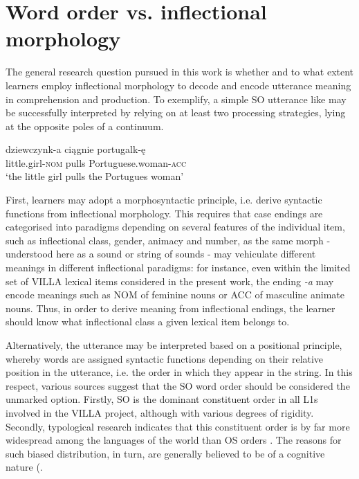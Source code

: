 \section{Word order vs. inflectional morphology}\label{sec:01:1}

The general research question pursued in this work is whether and to what extent learners employ inflectional morphology to decode and encode utterance meaning in comprehension and production. To exemplify, a simple SO utterance like  may be successfully interpreted by relying on at least two processing strategies, lying at the opposite poles of a continuum. 

\ea%
    \label{ex:01:3}
    \gll    dziewczynk-a ciągnie portugalk-ę\\
            little.girl-\textsc{nom} pulls Portuguese.woman-\textsc{acc}\\
    \glt    ‘the little girl pulls the Portugues woman’
    \z

First, learners may adopt a morphosyntactic principle, i.e. derive syntactic functions from inflectional morphology. This requires that case endings are categorised into paradigms depending on several features of the individual item, such as inflectional class, gender, animacy and number, as the same morph - understood here as a sound or string of sounds - may vehiculate different meanings in different inflectional paradigms: for instance, even within the limited set of VILLA lexical items considered in the present work, the ending \textit{{}-a} may encode meanings such as NOM of feminine nouns or ACC of masculine animate nouns. Thus, in order to derive meaning from inflectional endings, the learner should know what inflectional class a given lexical item belongs to.

Alternatively, the utterance may be interpreted based on a positional principle, whereby words are assigned syntactic functions depending on their relative position in the utterance, i.e. the order in which they appear in the string. In this respect, various sources suggest that the SO word order should be considered the unmarked option. Firstly, SO is the dominant constituent order in all L1s involved in the VILLA project, although with various degrees of rigidity. Secondly, typological research indicates that this constituent order is by far more widespread among the languages of the world than OS orders \citep{Dryer2013b}. The reasons for such biased distribution, in turn, are generally believed to be of a cognitive nature (\citealt{SiewierskaBakker2008}.

